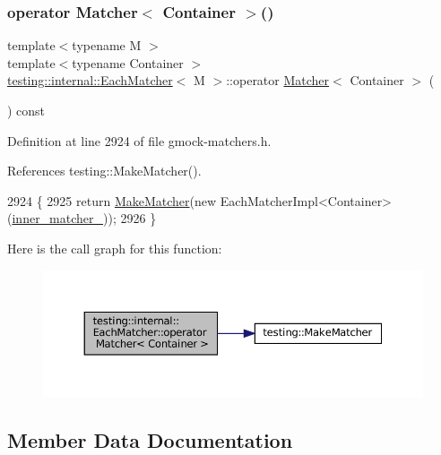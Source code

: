 \subsubsection{\texorpdfstring{operator Matcher$<$ Container $>$()}{operator Matcher< Container >()}}
{\footnotesize\ttfamily template$<$typename M $>$ \\
template$<$typename Container $>$ \\
\hyperlink{classtesting_1_1internal_1_1EachMatcher}{testing\+::internal\+::\+Each\+Matcher}$<$ M $>$\+::operator \hyperlink{classtesting_1_1Matcher}{Matcher}$<$ Container $>$ (\begin{DoxyParamCaption}{ }\end{DoxyParamCaption}) const\hspace{0.3cm}{\ttfamily [inline]}}



Definition at line 2924 of file gmock-\/matchers.\+h.



References testing\+::\+Make\+Matcher().


\begin{DoxyCode}
2924                                       \{
2925     \textcolor{keywordflow}{return} \hyperlink{namespacetesting_a37fd8029ac00e60952440a3d9cca8166}{MakeMatcher}(\textcolor{keyword}{new} EachMatcherImpl<Container>(\hyperlink{classtesting_1_1internal_1_1EachMatcher_ab960b6a042a3fab3b1d17f58cd50be5c}{inner\_matcher\_}));
2926   \}
\end{DoxyCode}
Here is the call graph for this function\+:
\nopagebreak
\begin{figure}[H]
\begin{center}
\leavevmode
\includegraphics[width=350pt]{classtesting_1_1internal_1_1EachMatcher_a81bd8bb67346dd2c07c7bf85a1b2d062_cgraph}
\end{center}
\end{figure}


\subsection{Member Data Documentation}
\mbox{\label{classtesting_1_1internal_1_1EachMatcher_ab960b6a042a3fab3b1d17f58cd50be5c}} 
